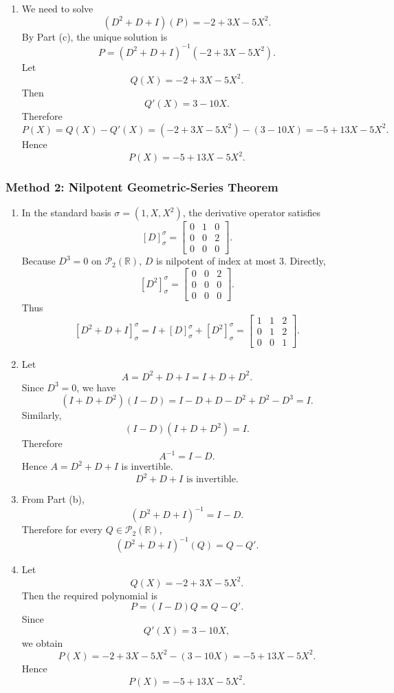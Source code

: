 \documentclass[12pt]{article}
\newcommand{\R}{\mathbb{R}}
\newcommand{\cP}{\mathcal{P}}
\begin{document}
\begin{enumerate}[label=(\alph*)]
  \item We need to solve
  \[
    (D^2+D+I)(P)=-2+3X-5X^2.
  \]
  By Part (c), the unique solution is
  \[
    P=(D^2+D+I)^{-1}(-2+3X-5X^2).
  \]
  Let
  \[
    Q(X)=-2+3X-5X^2.
  \]
  Then
  \[
    Q'(X)=3-10X.
  \]
  Therefore
  \[
    P(X)=Q(X)-Q'(X)
    =(-2+3X-5X^2)-(3-10X)
    =-5+13X-5X^2.
  \]
  Hence
  \[
    \boxed{P(X)=-5+13X-5X^2.}
  \]
\end{enumerate}

\newpage
\subsubsection{Method 2: Nilpotent Geometric-Series Theorem}
\begin{enumerate}[label=(\alph*)]
  \item In the standard basis $\sigma=(1,X,X^2)$, the derivative operator satisfies
  \[
    [D]_{\sigma}^{\sigma}
    =
    \begin{bmatrix}
      0&1&0\\
      0&0&2\\
      0&0&0
    \end{bmatrix}.
  \]
  Because $D^3=0$ on $\cP_2(\R)$, $D$ is nilpotent of index at most $3$. Directly,
  \[
    [D^2]_{\sigma}^{\sigma}
    =
    \begin{bmatrix}
      0&0&2\\
      0&0&0\\
      0&0&0
    \end{bmatrix}.
  \]
  Thus
  \[
    [D^2+D+I]_{\sigma}^{\sigma}
    =
    I+[D]_{\sigma}^{\sigma}+[D^2]_{\sigma}^{\sigma}
    =
    \boxed{
    \begin{bmatrix}
      1&1&2\\
      0&1&2\\
      0&0&1
    \end{bmatrix}.}
  \]

  \item Let
  \[
    A=D^2+D+I=I+D+D^2.
  \]
  Since $D^3=0$, we have
  \[
    (I+D+D^2)(I-D)
    =I-D+D-D^2+D^2-D^3
    =I.
  \]
  Similarly,
  \[
    (I-D)(I+D+D^2)=I.
  \]
  Therefore
  \[
    A^{-1}=I-D.
  \]
  Hence $A=D^2+D+I$ is invertible.
  \[
    \boxed{D^2+D+I\text{ is invertible}.}
  \]

  \item From Part (b),
  \[
    (D^2+D+I)^{-1}=I-D.
  \]
  Therefore for every $Q\in\cP_2(\R)$,
  \[
    \boxed{(D^2+D+I)^{-1}(Q)=Q-Q'.}
  \]

  \item Let
  \[
    Q(X)=-2+3X-5X^2.
  \]
  Then the required polynomial is
  \[
    P=(I-D)Q=Q-Q'.
  \]
  Since
  \[
    Q'(X)=3-10X,
  \]
  we obtain
  \[
    P(X)=-2+3X-5X^2-(3-10X)
    =-5+13X-5X^2.
  \]
  Hence
  \[
    \boxed{P(X)=-5+13X-5X^2.}
  \]
\end{enumerate}
\end{document}
